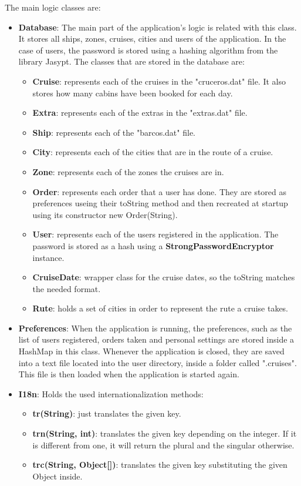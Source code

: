 \documentclass[11pt]{article}
\begin{document}
	The main logic classes are:
	\begin{itemize}
		\item \textbf{Database}: The main part of the application's logic is related with this class. It stores all ships, zones, cruises, cities and users of the application. In the case of users, the password is stored using a hashing algorithm from the library Jasypt. The classes that are stored in the database are:
		\begin{itemize}
			\item \textbf{Cruise}: represents each of the cruises in the "cruceros.dat" file. It also stores how many cabins have been booked for each day.
			\item \textbf{Extra}: represents each of the extras in the "extras.dat" file.
			\item \textbf{Ship}: represents each of the "barcos.dat" file.
			\item \textbf{City}: represents each of the cities that are in the route of a cruise.
			\item \textbf{Zone}: represents each of the zones the cruises are in.
			\item \textbf{Order}: represents each order that a user has done. They are stored as preferences useing their toString method and then recreated at startup using its constructor new Order(String).
			\item \textbf{User}: represents each of the users registered in the application. The password is stored as a hash using a \textbf{StrongPasswordEncryptor} instance.
			\item \textbf{CruiseDate}: wrapper class for the cruise dates, so the toString matches the needed format.
			\item \textbf{Rute}: holds a set of cities in order to represent the rute a cruise takes.
		\end{itemize}
		\item \textbf{Preferences}: When the application is running, the preferences, such as the list of users registered, orders taken and personal settings are stored inside a HashMap in this class. Whenever the application is closed, they are saved into a text file located into the user directory, inside a folder called ".cruises". This file is then loaded when the application is started again.
		\item \textbf{I18n}: Holds the used internationalization methods:
		\begin{itemize}
			\item \textbf{tr(String)}: just translates the given key.
			\item \textbf{trn(String, int)}: translates the given key depending on the integer. If it is different from one, it will return the plural and the singular otherwise.
			\item \textbf{trc(String, Object[])}: translates the given key substituting the given Object inside.
		\end{itemize}
   \end{itemize}
\end{document}

